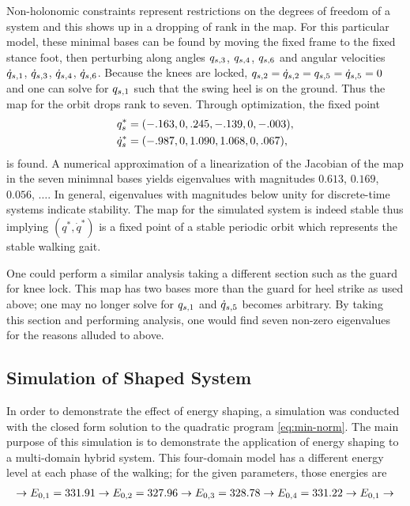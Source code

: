 Non-holonomic constraints represent restrictions on the degrees of freedom of a
system and this shows up in a dropping of rank in the \Poincare{} map.
%
For this particular model, these minimal bases can be found by moving the fixed
frame to the fixed stance foot, then perturbing along angles $q_{s,3}$,
$q_{s,4}$, $q_{s,6}$ and angular velocities $\dot{q}_{s,1}$, $\dot{q}_{s,3}$, $\dot{q}_{s,4}$,
$\dot{q}_{s,6}$.
%
Because the knees are locked, $q_{s,2} = \dot{q}_{s,2} = q_{s,5} = \dot{q}_{s,5} = 0$ and
one can solve for $q_{s,1}$ such that the swing heel is on the ground.
%
Thus the \Poincare{} map for the orbit drops rank to seven.
%
Through optimization, the fixed point
\begin{align*}
  q_{s}^{*} &= (-.163, 0, .245, -.139, 0, -.003),\\
  \dot{q}_{s}^{*} &= (-.987, 0, 1.090, 1.068, 0, .067),
\end{align*}
is found.
%
A numerical approximation of a linearization of the Jacobian of the \Poincare{}
map in the seven minimnal bases yields eigenvalues with magnitudes $0.613$,
$0.169$, $0.056$, $\ldots$.
%
In general, eigenvalues with magnitudes below unity for discrete-time systems
indicate stability.
%
The \Poincare{} map for the simulated system is indeed stable thus implying
$(q^*, \dot q^*)$ is a fixed point of a stable periodic orbit which represents
the stable walking gait.

One could perform a similar analysis taking a different \Poincare{} section such
as the guard for knee lock.
%
This map has two bases more than the guard for heel strike as used above;
%
one may no longer solve for $q_{s,1}$ and $\dot{q}_{s,5}$ becomes arbitrary.
%
By taking this \Poincare{} section and performing analysis, one would find seven
non-zero eigenvalues for the reasons alluded to above.

\subsection{Simulation of Shaped System}

In order to demonstrate the effect of energy shaping, a simulation was conducted
with the closed form solution to the quadratic program \eqref{eq:min-norm}.
%
The main purpose of this simulation is to demonstrate the application of energy
shaping to a multi-domain hybrid system.
%
This four-domain model has a different energy level at each phase of the
walking; for the given parameters, those energies are
\begin{align*}
  \to E_{0, 1} = 331.91 \to
  E_{0, 2} = 327.96 \to
  E_{0, 3} = 328.78 \to
  E_{0, 4} = 331.22 \to E_{0, 1} \to
\end{align*}